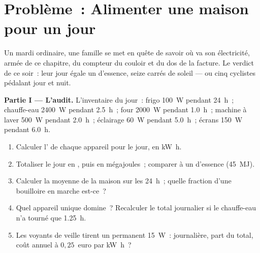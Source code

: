\section{Problème~: Alimenter une maison pour un jour}

\begin{problem}
\label{pb:g10:energy-conservation:1}
Un mardi ordinaire, une famille se met en quête de savoir où va son
électricité, armée de ce chapitre, du compteur du couloir et du dos de
la facture. Le verdict de ce soir~: leur jour égale un
 d'essence, seize
 carrés de soleil --- ou cinq cyclistes pédalant
jour et nuit.

\medskip
\noindent\textbf{Partie I --- L'audit.}
L'inventaire du jour~: frigo \qty{100}{W} pendant \qty{24}{h}~;
chauffe-eau \qty{2400}{W} pendant \qty{2.5}{h}~; four \qty{2000}{W}
pendant \qty{1.0}{h}~; machine à laver \qty{500}{W} pendant
\qty{2.0}{h}~; éclairage \qty{60}{W} pendant \qty{5.0}{h}~; écrans
\qty{150}{W} pendant \qty{6.0}{h}.
\begin{enumerate}
  \item Calculer l' de chaque appareil pour le
        jour, en \unit{kW.h}.
  \item Totaliser le jour en , puis en
        mégajoules~; comparer à un  d'essence
        (\qty{45}{MJ}).
  \item Calculer la  moyenne de la maison
        sur les \qty{24}{h}~; quelle fraction d'une bouilloire en
        marche est-ce~?
  \item Quel appareil unique domine~? Recalculer le total journalier
        si le chauffe-eau n'a tourné que \qty{1.25}{h}.
  \item Les voyants de veille tirent un permanent \qty{15}{W}~:
         journalière, part du total, coût
        annuel à $0{,}25$~euro par \unit{kW.h}~?
\end{enumerate}


\end{problem}
